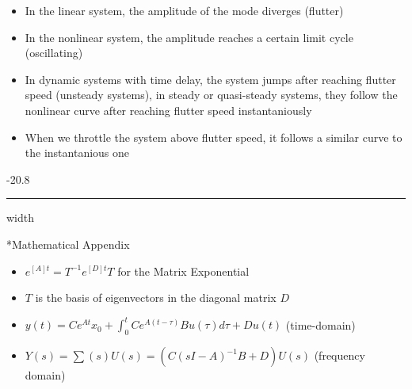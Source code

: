 \documentclass[8pt, landscape, fleqn]{scrartcl}
\makeatletter
\renewcommand{\subsubsection}{\@startsection{subsubsection}{1}{0mm}%
{-2\baselineskip}{0.8\baselineskip}%
{\hrule depth 0.2pt width\columnwidth\vspace*{1.2em}\normalsize\bfseries\rmfamily}}
\makeatother
\begin{document}
\begin{multicols*}{3}
\begin{itemize}
        \item In the linear system, the amplitude of the mode diverges (flutter)
        \item In the nonlinear system, the amplitude reaches a certain limit cycle (oscillating)
        \item In dynamic systems with time delay, the system jumps after reaching flutter speed (unsteady systems), in steady or quasi-steady systems, they follow the nonlinear curve after reaching flutter speed instantaniously
        \item When we throttle the system above flutter speed, it follows a similar curve to the instantanious one 
    \end{itemize}

 \subsubsection*{Mathematical Appendix}

    \begin{itemize}
        \item $e^{[A]t} = T^{-1} e^{[D]t} T$ for the Matrix Exponential
        \item $T$ is the basis of eigenvectors in the diagonal matrix $D$
        \item $y(t) = C e^{At}x_0+ \int_0^t C e^{A(t-\tau)}Bu(\tau)d\tau + D u(t)$ (time-domain)
        \item $Y(s) = \sum(s)U(s) = (C(sI-A)^{-1}B+D)U(s)$ (frequency domain)
    \end{itemize}

\end{multicols*}
\end{document}
